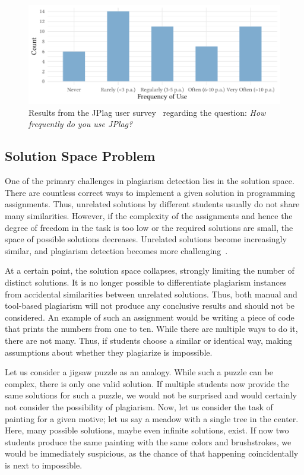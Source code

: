 \begin{figure}[p]
\centering
\includegraphics[width=\linewidth]{figures/survey/survey-frequency.pdf}
\caption[JPlag Survey: Usage Frequency]{Results from the JPlag user survey~\cite{JPlagSurvey2024} regarding the question: \textit{How frequently do you use JPlag?}}
\label{fig:survey-frequency}
\end{figure}

\subsection{Solution Space Problem}\label{sec:SPD-problem}
One of the primary challenges in plagiarism detection lies in the solution space. There are countless correct ways to implement a given solution in programming assignments. 
Thus, unrelated solutions by different students usually do not share many similarities. However, if the complexity of the assignments and hence the degree of freedom in the task is too low or the required solutions are small, the space of possible solutions decreases. Unrelated solutions become increasingly similar, and plagiarism detection becomes more challenging~\cite{Saglam2024b}.

At a certain point, the solution space collapses, strongly limiting the number of distinct solutions. It is no longer possible to differentiate plagiarism instances from accidental similarities between unrelated solutions. Thus, both manual and tool-based plagiarism will not produce any conclusive results and should not be considered.
An example of such an assignment would be writing a piece of code that prints the numbers from one to ten. While there are multiple ways to do it, there are not many. Thus, if students choose a similar or identical way, making assumptions about whether they plagiarize is impossible.

Let us consider a jigsaw puzzle as an analogy. While such a puzzle can be complex, there is only one valid solution. If multiple students now provide the same solutions for such a puzzle, we would not be surprised and would certainly not consider the possibility of plagiarism.
Now, let us consider the task of painting for a given motive; let us say a meadow with a single tree in the center. Here, many possible solutions, maybe even infinite solutions, exist. If now two students produce the same painting with the same colors and brushstrokes, we would be immediately suspicious, as the chance of that happening coincidentally is next to impossible.

